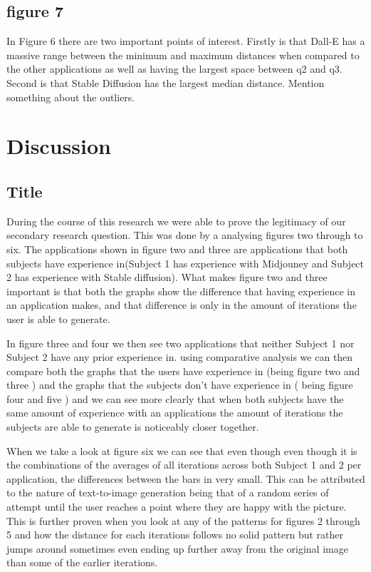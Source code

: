 \documentclass[]{report}
\begin{document}
\subsection{figure 7}
	
	In Figure 6 there are two important points of interest. Firstly is that Dall-E has a massive range between the minimum and maximum distances when compared to the other applications as well as having the largest space between q2 and q3. Second is that Stable Diffusion has the largest median distance. Mention something about the outliers.
	
	
	\pagebreak
	\section{Discussion}
	\subsection{Title}
	
	During the course of this research we were able to prove the legitimacy of our secondary research question. This was done by a analysing figures two through to six. The applications shown in figure two and three are applications that both subjects have experience in(Subject 1 has experience with Midjouney and Subject 2 has experience with Stable diffusion). What makes figure two and three important is that both the graphs show the difference that having experience in an application makes, and that difference is only in the amount of iterations the user is able to generate. 
	
	In figure three and four we then see two applications that neither Subject 1 nor Subject 2 have any prior experience in. using comparative analysis we can then compare both the graphs that the users have experience in (being figure two and three ) and the graphs that the subjects don't have experience in ( being figure four and five ) and we can see more clearly that when both subjects have the same amount of experience with an applications the amount of iterations the subjects are able to generate is noticeably closer together. 
	
	When we take a look at figure six we can see that even though even though it is the combinations of the averages of all iterations across both Subject 1 and 2 per application, the differences between the bars in very small. This can be attributed to the nature of text-to-image generation being that of a random series of attempt until the user reaches a point where they are happy with the picture. This is further proven when you look at any of the patterns for figures 2 through 5 and how the distance for each iterations follows no solid pattern but rather jumps around sometimes even ending up further away from the original image than some of the earlier iterations.
	
\end{document}
